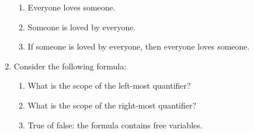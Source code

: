 \begin{enumerate}
\begin{enumerate}
   \item Everyone loves someone.

   \item Someone is loved by everyone.

   \item If someone is loved by everyone, then everyone loves someone.

  \end{enumerate}


 \item Consider the following formula:

 
 
	\begin{enumerate}

	 \item What is the scope of the left-most quantifier?

	 \item What is the scope of the right-most quantifier?

	 \item True of false: the formula contains free variables.

	\end{enumerate}
\end{enumerate}
